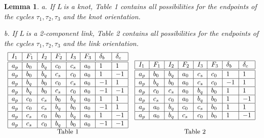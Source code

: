 \documentclass[12pt]{article}%
\newtheorem{lemma}[theorem]{Lemma}
\begin{document}
\begin{lemma}
a. If $L\ $is a knot, Table 1 contains all possibilities for the endpoints of
the cycles $\tau_{1},\tau_{2},\tau_{3}$ and the knot orientation.

b. If $L\ $is a 2-component link, Table 2 contains all possibilities for the
endpoints of the cycles $\tau_{1},\tau_{2},\tau_{3}$ and the link
orientation.
\[%
\begin{array}
[c]{cc}%
\begin{tabular}
[c]{|l|l|l|l|l|l|l|l|}\hline
$I_{1}$ & $F_{1}$ & $I_{2}$ & $F_{2}$ & $I_{3}$ & $F_{3}$ & $\delta_{b}$ &
$\delta_{c}$\\\hline\hline
$a_{p}$ & $b_{0}$ & $b_{q}$ & $c_{0}$ & $c_{s}$ & $a_{0}$ & $1$ & $1$\\\hline
$a_{p}$ & $b_{0}$ & $b_{q}$ & $c_{s}$ & $c_{0}$ & $a_{0}$ & $1$ & $-1$\\\hline
$a_{p}$ & $b_{q}$ & $b_{0}$ & $c_{0}$ & $c_{s}$ & $a_{0}$ & $-1$ & $1$\\\hline
$a_{p}$ & $b_{q}$ & $b_{0}$ & $c_{s}$ & $c_{0}$ & $a_{0}$ & $-1$ &
$-1$\\\hline
$a_{p}$ & $c_{0}$ & $c_{s}$ & $b_{0}$ & $b_{q}$ & $a_{0}$ & $1$ & $1$\\\hline
$a_{p}$ & $c_{0}$ & $c_{s}$ & $b_{q}$ & $b_{0}$ & $a_{0}$ & $-1$ & $1$\\\hline
$a_{p}$ & $c_{s}$ & $c_{0}$ & $b_{0}$ & $b_{q}$ & $a_{0}$ & $1$ & $-1$\\\hline
$a_{p}$ & $c_{s}$ & $c_{0}$ & $b_{q}$ & $b_{0}$ & $a_{0}$ & $-1$ &
$-1$\\\hline
\end{tabular}
&
\begin{tabular}
[c]{|l|l|l|l|l|l|l|l|}\hline
$I_{1}$ & $F_{1}$ & $I_{2}$ & $F_{2}$ & $I_{3}$ & $F_{3}$ & $\delta_{b}$ &
$\delta_{c}$\\\hline\hline
$a_{p}$ & $b_{0}$ & $b_{q}$ & $a_{0}$ & $c_{s}$ & $c_{0}$ & $1$ & $1$\\\hline
$a_{p}$ & $b_{q}$ & $b_{0}$ & $a_{0}$ & $c_{s}$ & $c_{0}$ & $-1$ & $1$\\\hline
$a_{p}$ & $c_{0}$ & $c_{s}$ & $a_{0}$ & $b_{q}$ & $b_{0}$ & $1$ & $1$\\\hline
$a_{p}$ & $c_{s}$ & $c_{0}$ & $a_{0}$ & $b_{q}$ & $b_{0}$ & $1$ & $-1$\\\hline
$a_{p}$ & $a_{0}$ & $b_{q}$ & $c_{0}$ & $c_{s}$ & $b_{0}$ & $1$ & $1$\\\hline
$a_{p}$ & $a_{0}$ & $b_{q}$ & $c_{s}$ & $c_{0}$ & $b_{0}$ & $1$ & $-1$\\\hline
\end{tabular}
\\
\text{ Table 1\ } & \text{Table 2}%
\end{array}
\]

\end{lemma}
\end{document}
